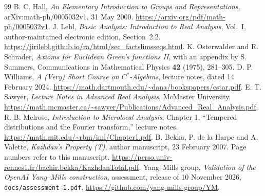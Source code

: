 \begin{thebibliography}{99}
 B. C. Hall,
\emph{An Elementary Introduction to Groups and Representations},
arXiv:math-ph/0005032v1, 31 May 2000.
\url{https://arxiv.org/pdf/math-ph/0005032v1}.
 J. Lebl,
\emph{Basic Analysis: Introduction to Real Analysis}, Vol.~I,
author-maintained electronic edition, Section~2.2.
\url{https://jirilebl.github.io/ra/html/sec_factslimsseqs.html}.
 K. Osterwalder and R. Schrader,
\emph{Axioms for Euclidean Green's functions II}, with an appendix by
S. Summers,
Communications in Mathematical Physics \textbf{42} (1975), 281--305.
 D. P. Williams,
\emph{A (Very) Short Course on $C^*$-Algebras},
lecture notes, dated 14 February 2024.
\url{https://math.dartmouth.edu/~dana/bookspapers/cstar.pdf}.
 E. T. Sawyer,
\emph{Lecture Notes in Advanced Real Analysis},
McMaster University.
\url{https://math.mcmaster.ca/~sawyer/Publications/Advanced_Real_Analysis.pdf}.
 R. B. Melrose,
\emph{Introduction to Microlocal Analysis}, Chapter 1,
``Tempered distributions and the Fourier transform,'' lecture notes.
\url{https://math.mit.edu/~rbm/iml/Chapter1.pdf}.
 B. Bekka, P. de la Harpe and A. Valette,
\emph{Kazhdan's Property (T)}, author manuscript, 23 February 2007.
Page numbers refer to this manuscript.
\url{https://perso.univ-rennes1.fr/bachir.bekka/KazhdanTotal.pdf}.
 Yang--Mills group,
\emph{Validation of the OpenAI Yang--Mills construction},
assessment, release of 10 November 2026, \texttt{docs/assessment-1.pdf}.
\url{https://github.com/yang-mills-group/YM}.


\end{thebibliography}
